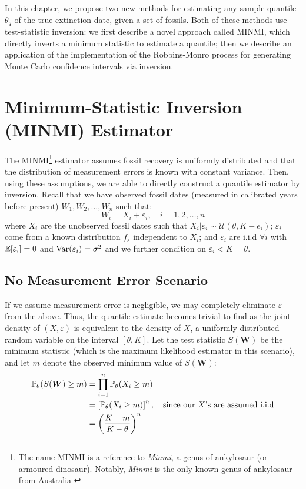
In this chapter, we propose two new methods for estimating any sample quantile $\theta_q$ of the true extinction date, given a set of fossils. Both of these methods use test-statistic inversion: we first describe a novel approach called MINMI, which directly inverts a minimum statistic to estimate a quantile; then we describe an application of the \citet{Garthwaite1992} implementation of the Robbins-Monro process for generating Monte Carlo confidence intervals via inversion. 

\section{Minimum-Statistic Inversion (MINMI) Estimator}\label{new-method}

The MINMI\footnote{The name MINMI is a reference to \textit{Minmi}, a genus of ankylosaur (or armoured dinosaur). Notably, \textit{Minmi} is the only known genus of ankylosaur from Australia \cite{Carpenter2001}} estimator assumes fossil recovery is uniformly distributed and that the distribution of measurement errors is known with constant variance. Then, using these assumptions, we are able to directly construct a quantile estimator by inversion. Recall that we have observed fossil dates (measured in calibrated years before present) $W_1, W_2, \dots, W_n$ such that:
\[
W_i = X_i + \varepsilon_i, \quad i = 1, 2, \dots, n
\]
where $X_i$ are the unobserved fossil dates such that $X_i | \varepsilon_i \sim \mathcal{U}(\theta, K - e_i)$; $\varepsilon_i$ come from a known distribution $f_{\varepsilon}$ independent to $X_i$; and $\varepsilon_i$ are i.i.d $\forall i$ with $\mathbb{E}[\varepsilon_i] = 0$ and $\mathrm{Var}(\varepsilon_i) = \sigma^2$ and we further condition on $\varepsilon_i<K=\theta$.

\subsection{No Measurement Error Scenario}

If we assume measurement error is negligible, we may completely eliminate $\varepsilon$ from the above. Thus, the quantile estimate becomes trivial to find as the joint density of $(X, \varepsilon)$ is equivalent to the density of $X$, a uniformly distributed random variable on the interval $[\theta, K]$. Let the test statistic $S(\bm{W})$ be the minimum statistic (which is the maximum likelihood estimator in this scenario), and let $m$ denote the observed minimum value of $S(\bm{W})$:
\begin{align*}
    \mathbb{P}_\theta (S(\bm{W}) \geq m)
        &= \prod_{i=1}^n \mathbb{P}_\theta (X_i \geq m) \\
        &= \left[ \mathbb{P}_\theta (X_i \geq m) \right]^n, \quad \text{since our $X$'s are assumed i.i.d}\\
        &= \left( \frac{K - m}{K - \theta} \right)^n
\end{align*}

